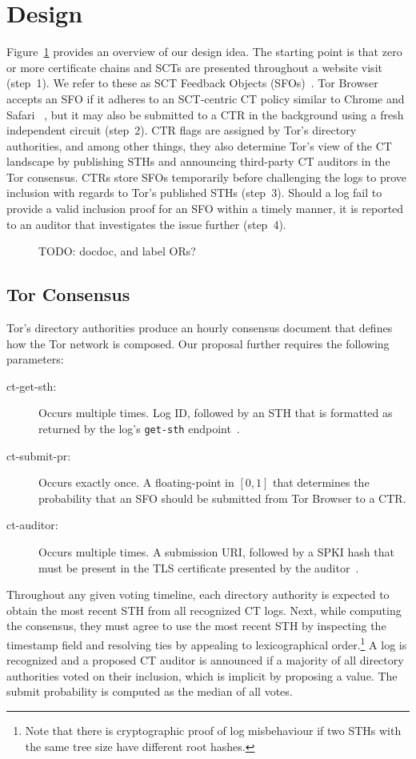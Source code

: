 \section{Design}
Figure~\ref{fig:overview} provides an overview of our design idea.  The starting
point is that zero or more certificate chains and SCTs are presented
throughout a website visit (step~1).  We refer to these as SCT Feedback Objects
(SFOs)~\cite{nordberg}.  Tor Browser accepts an SFO if it adheres to an
SCT-centric CT policy similar to Chrome and Safari~%
\cite{chrome-policy,safari-policy}, but it may also be submitted to a CTR
in the background using a fresh independent circuit (step~2).  CTR flags are
assigned by Tor's directory authorities, and among other things, they also
determine Tor's view of the CT landscape by publishing STHs and announcing
third-party CT auditors in the Tor consensus.  CTRs store SFOs temporarily
before challenging the logs to prove inclusion with regards to Tor's published
STHs (step~3).  Should a log fail to provide a valid inclusion proof for an SFO
within a timely manner, it is reported to an auditor that investigates the issue
further (step~4).
\begin{figure}
	\centering
	
	\caption{%
		TODO: docdoc, and label ORs?
	}
	\label{fig:overview}
\end{figure}

\subsection{Tor Consensus}
Tor's directory authorities produce an hourly consensus document that defines
how the Tor network is composed.  Our proposal further requires the following
parameters:
\begin{description}
	\item[ct-get-sth:] Occurs multiple times.  Log ID, followed by an STH that is
		formatted as returned by the log's \texttt{get-sth}
		endpoint~\cite{ct,ct/bis}.
	\item[ct-submit-pr:] Occurs exactly once.  A floating-point in $[0,1]$
		that determines the probability that an SFO should be submitted from Tor
		Browser to a CTR.
	\item[ct-auditor:] Occurs multiple times.  A submission URI, followed by a
		SPKI hash that must be present in the TLS certificate presented by the
		auditor~\cite{hpkp}.
\end{description}

Throughout any given voting timeline, each directory authority is expected to
obtain the most recent STH from all recognized CT logs.  Next, while computing
the consensus, they must agree to use the most recent STH by inspecting the
timestamp field and resolving ties by appealing to lexicographical
order.\footnote{%
	Note that there is cryptographic proof of log misbehaviour if two STHs with
	the same tree size have different root hashes.
}  A log is recognized and a proposed CT auditor is announced if a majority of
all directory authorities voted on their inclusion, which is implicit by
proposing a value.  The submit probability is computed as
the median of all votes.

